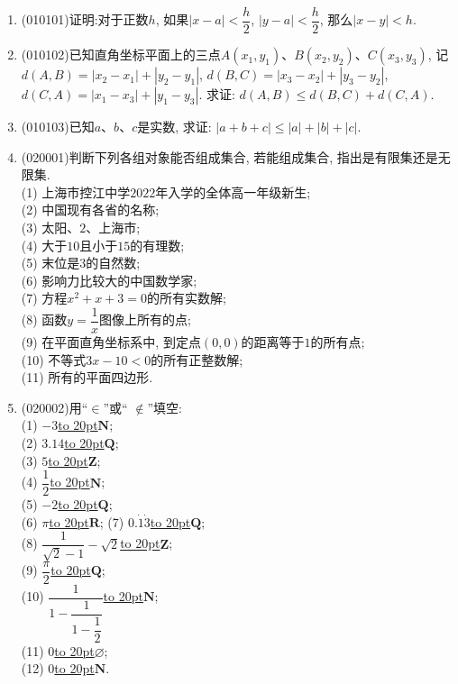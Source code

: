 \documentclass[10pt,a4paper]{article}
\newcommand{\blank}[1]{\underline{\hbox to #1pt{}}}
\begin{document}
\begin{enumerate}[1.]

\item {\tiny (010101)}证明:对于正数$h$, 如果$|x-a| <\dfrac h2$, $|y-a| <\dfrac h2$, 那么$|x-y| <h$.
\item {\tiny (010102)}已知直角坐标平面上的三点$A(x_1, y_1)$、$B(x_2, y_2)$、$C(x_3, y_3)$, 记$d(A, B)=|x_2-x_1| +|y_2-y_1|$, $d(B, C)=|x_3-x_2| +|y_3-y_2|$, $d(C, A)=|x_1-x_3| +|y_1-y_3|$. 求证: $d(A, B)\le d(B, C)+d(C, A)$.
\item {\tiny (010103)}已知$a$、$b$、$c$是实数, 求证: $|a+b+c| \le |a|+|b|+|c|$.
\item {\tiny (020001)}判断下列各组对象能否组成集合, 若能组成集合, 指出是有限集还是无限集.\\
(1) 上海市控江中学$2022$年入学的全体高一年级新生;\\
(2) 中国现有各省的名称;\\
(3) 太阳、$2$、上海市;\\
(4) 大于$10$且小于$15$的有理数;\\
(5) 末位是$3$的自然数;\\
(6) 影响力比较大的中国数学家;\\
(7) 方程$x^2+x+3=0$的所有实数解;\\ 
(8) 函数$y=\dfrac 1x$图像上所有的点;\\ 
(9) 在平面直角坐标系中, 到定点$(0, 0)$的距离等于$1$的所有点;\\
(10) 不等式$3x-10<0$的所有正整数解;\\
(11) 所有的平面四边形.
\item {\tiny (020002)}用``$\in$''或`` $\notin$''填空:\\
(1) $-3$\blank{20}$\mathbf{N}$;\\
(2) $3.14$\blank{20}$\mathbf{Q}$;\\
(3) $5$\blank{20}$\mathbf{Z}$;\\
(4) $\dfrac 12$\blank{20}$\mathbf{N}$;\\
(5) $-2$\blank{20}$\mathbf{Q}$;\\
(6) $\pi$\blank{20}$\mathbf{R}$; 
(7) $0.\dot{1}\dot{3}$\blank{20}$\mathbf{Q}$;\\ 
(8) $\dfrac 1{\sqrt 2-1}-\sqrt 2$\blank{20}$\mathbf{Z}$;\\
(9) $\dfrac{\pi}2$\blank{20}$\mathbf{Q}$;\\
(10) $\dfrac 1{1-\dfrac 1{1-\dfrac 12}}$\blank{20}$\mathbf{N}$;\\
(11) $0$\blank{20}$\varnothing$;\\
(12) $0$\blank{20}$\mathbf{N}$.

\end{enumerate}
\end{document}
